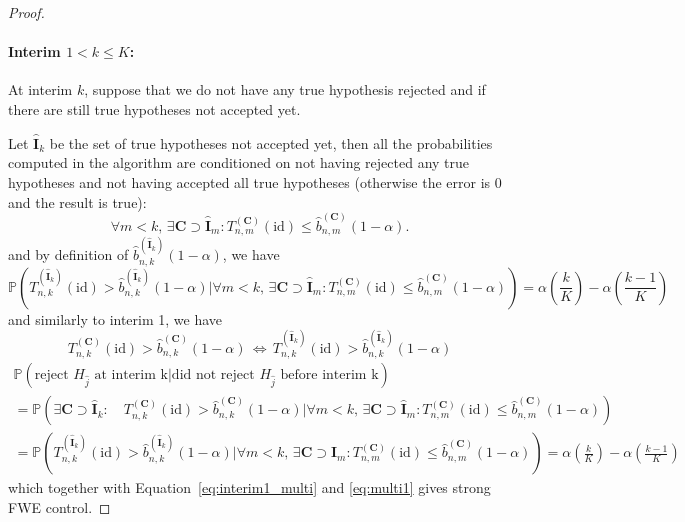 \documentclass{article}
\theoremstyle{plain}
\theoremstyle{remark}
\renewcommand{\P}{\mathbb{P}}
\newcommand{\1}{\mathbbm{1}}
\newcommand{\id}{\mathrm{id}}
\numberwithin{equation}{section}
\begin{document}
\begin{proof}
\paragraph{Interim $1<k\le  K$:}

At interim $k$, suppose that we do not have any true hypothesis rejected and if there are still true hypotheses not accepted yet.

Let $\widehat{\textbf{I}}_k$ be the set of true hypotheses not accepted yet, then all the probabilities computed in the algorithm are conditioned on not having rejected any true hypotheses and not having accepted all true hypotheses (otherwise the error is $0$ and the result is true):
$$\forall m < k, \, \exists \textbf{C} \supset \widehat{\textbf{I}}_m  : T_{n,m}^{(\textbf{C})}(\id) \le \widehat{b}_{n,m}^{(\textbf{C})}(1-\alpha).$$
and by definition of $\widehat{b}_{n,k}^{(\widehat{\textbf{I}}_k)}(1-\alpha)$, we have
$$\P\left( T_{n,k}^{(\widehat{\textbf{I}}_k)}(\id)> \widehat{b}_{n,k}^{(\widehat{\textbf{I}}_k)}(1-\alpha)  \Big|\forall m < k, \, \exists \textbf{C} \supset \widehat{\textbf{I}}_m  : T_{n,m}^{(\textbf{C})}(\id) \le \widehat{b}_{n,m}^{(\textbf{C})}(1-\alpha)\right) = \alpha\left(\frac{k}{K}\right)-\alpha\left(\frac{k-1}{K}\right) $$
and similarly to interim 1, we have 
$$T_{n,k}^{(\textbf{C})}(\id)> \widehat{b}_{n,k}^{(\textbf{C})}(1-\alpha)\, \Leftrightarrow \,
 T_{n,k}^{(\widehat{\textbf{I}}_k)}(\id) > \widehat{b}_{n,k}^{(\widehat{\textbf{I}}_k)}(1-\alpha)  $$
 \begin{multline*}
\P\left(\text{reject }H_{\widehat{j}} \text{ at interim k} \Big| \text{did not reject }H_{\widehat{j}} \text{ before interim k}\right)\\
= \P\left( \exists \textbf{C} \supset \widehat{\textbf{I}}_k :\quad  T_{n,k}^{(\textbf{C})}(\id)> \widehat{b}_{n,k}^{(\textbf{C})}(1-\alpha)  \Big|  \forall m < k, \, \exists \textbf{C} \supset \widehat{\textbf{I}}_m  : T_{n,m}^{(\textbf{C})}(\id) \le \widehat{b}_{n,m}^{(\textbf{C})}(1-\alpha)\right)\\
= \P\left(T_{n,k}^{(\widehat{\textbf{I}}_k)}(\id) > \widehat{b}_{n,k}^{(\widehat{\textbf{I}}_k)}(1-\alpha)  \Big|  \forall m < k, \, \exists \textbf{C} \supset \widehat{\textbf{I}}_m  : T_{n,m}^{(\textbf{C})}(\id) \le \widehat{b}_{n,m}^{(\textbf{C})}(1-\alpha) \right)
 = \alpha\left(\frac{k}{K}\right)-\alpha\left(\frac{k-1}{K}\right)
\end{multline*}
which together with Equation~\eqref{eq:interim1_multi} and \eqref{eq:multi1} gives strong FWE control.

\end{proof}
\end{document}
